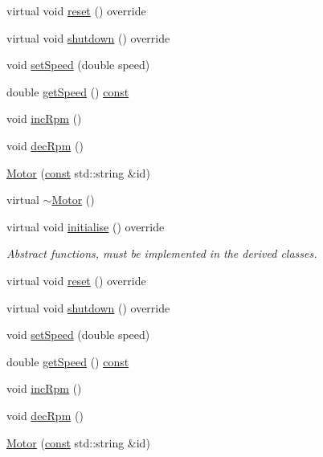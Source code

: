 \begin{DoxyCompactItemize}
virtual void \hyperlink{class_motor_a8118086ae56a38eca05df9a149bf22a6}{reset} () override
\item 
virtual void \hyperlink{class_motor_a2fb3663647ed56cc9061ab1a914df95a}{shutdown} () override
\item 
void \hyperlink{class_motor_a4aece812dc94b008a874e4b38c3a3863}{set\+Speed} (double speed)
\item 
double \hyperlink{class_motor_aa6ed19d9c4f2deb0bb38460e3572bdc4}{get\+Speed} () \hyperlink{functions__c_8js_afacfd9c985d225bb07483b887a801b6f}{const} 
\item 
void \hyperlink{class_motor_a93a4de89dd6f493c165137a78e3d97b4}{inc\+Rpm} ()
\item 
void \hyperlink{class_motor_ac271f30175d294a9d27d50193840d61e}{dec\+Rpm} ()
\item 
\hyperlink{class_motor_aade6af850e0177846336ddd136b1f2c9}{Motor} (\hyperlink{functions__c_8js_afacfd9c985d225bb07483b887a801b6f}{const} std\+::string \&id)
\item 
virtual \hyperlink{class_motor_a3135cf1bc9a3c68e1db0214c00a2b50f}{$\sim$\+Motor} ()
\item 
virtual void \hyperlink{class_motor_af499f6ed70a5f8a7f57b08c08b0c381f}{initialise} () override
\begin{DoxyCompactList}\small\item\em Abstract functions, must be implemented in the derived classes. \end{DoxyCompactList}\item 
virtual void \hyperlink{class_motor_a8118086ae56a38eca05df9a149bf22a6}{reset} () override
\item 
virtual void \hyperlink{class_motor_a2fb3663647ed56cc9061ab1a914df95a}{shutdown} () override
\item 
void \hyperlink{class_motor_a4aece812dc94b008a874e4b38c3a3863}{set\+Speed} (double speed)
\item 
double \hyperlink{class_motor_aa6ed19d9c4f2deb0bb38460e3572bdc4}{get\+Speed} () \hyperlink{functions__c_8js_afacfd9c985d225bb07483b887a801b6f}{const} 
\item 
void \hyperlink{class_motor_a93a4de89dd6f493c165137a78e3d97b4}{inc\+Rpm} ()
\item 
void \hyperlink{class_motor_ac271f30175d294a9d27d50193840d61e}{dec\+Rpm} ()
\item 
\hyperlink{class_motor_aade6af850e0177846336ddd136b1f2c9}{Motor} (\hyperlink{functions__c_8js_afacfd9c985d225bb07483b887a801b6f}{const} std\+::string \&id)
\item 

\end{DoxyCompactItemize}
